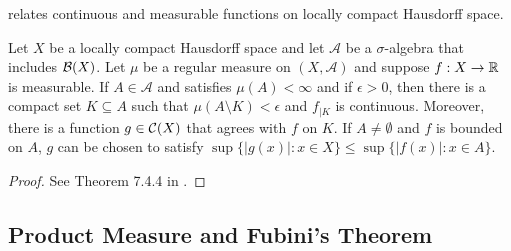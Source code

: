  relates continuous and measurable functions on locally compact Hausdorff space.

\begin{theorem}
\label{thm:measure:lusin}
Let $X$ be a locally compact Hausdorff space and let $\mathcal{A}$ be a $\sigma$-algebra that includes ${\mathcal B}(X)$. Let $\mu$ be a regular measure on $(X, \mathcal{A})$ and suppose $f : X \to {\mathbb R}$ is measurable. If $A \in \mathcal{A}$ and satisfies $\mu(A) < \infty$ and if $\epsilon > 0$, then there is a compact set $K \subseteq A$ such that $\mu(A \setminus K) < \epsilon$ and $f_{|K}$ is continuous. Moreover, there is a function $g \in {\mathcal C}(X)$ that agrees with $f$ on $K$.  If $A \neq \emptyset$ and $f$ is bounded on $A$, $g$ can be chosen to satisfy $\sup \{ |g(x)| : x \in X \} \leq \sup \{ |f(x)| : x \in A \}$.
\end{theorem}
\begin{proof}
See Theorem 7.4.4 in \cite{cohn_2013_measure}.
\end{proof}

\subsection{Product Measure and Fubini's Theorem}

